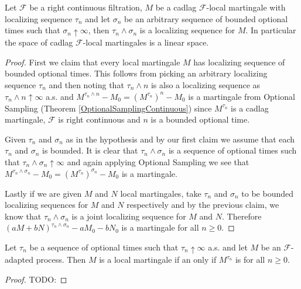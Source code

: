 \begin{lem}Let $\mathcal{F}$ be a right continuous filtration, $M$ be a cadlag $\mathcal{F}$-local martingale with localizing sequence $\tau_n$ and let $\sigma_n$ be an arbitrary sequence of bounded optional times such that $\sigma_n \uparrow \infty$, then $\tau_n \wedge \sigma_n$ is a localizing sequence for $M$.  In particular the space of cadlag $\mathcal{F}$-local martingales is a linear space.
\end{lem}
\begin{proof}
First we claim that every local martingale $M$ has localizing sequence of bounded optional times.  This follows from picking an arbitrary localizing sequence $\tau_n$ and then noting that $\tau_n \wedge n$ is also a localizing sequence as $\tau_n \wedge n \uparrow \infty$ a.s. and $M^{\tau_n \wedge n} -M_0 = (M^{\tau_n})^n - M_0$ is a martingale from Optional Sampling (Theorem \ref{OptionalSamplingContinuous}) since $M^{\tau_n}$ is a cadlag martingale, $\mathcal{F}$ is right continuous and $n$ is a bounded optional time.

Given $\tau_n$ and $\sigma_n$ as in the hypothesis and by our first claim we assume that each $\tau_n$ and $\sigma_n$ is bounded.  It is clear that $\tau_n \wedge \sigma_n$ is a sequence of optional times such that $\tau_n \wedge \sigma_n \uparrow \infty$ and again applying Optional Sampling we see that $M^{\tau_n \wedge \sigma_n} -M_0 = (M^{\tau_n})^{\sigma_n} - M_0$ is a martingale.  

Lastly if we are given $M$ and $N$ local martingales, take $\tau_n$ and $\sigma_n$ to be bounded localizing sequences for $M$ and $N$ respectively and by the previous claim, we know that $\tau_n \wedge \sigma_n$ is a joint localizing sequence for $M$ and $N$.   Therefore $(aM + bN)^{\tau_n \wedge \sigma_n} - a M_0 - b N_0$ is a martingale for all $n \geq 0$.
\end{proof}

\begin{lem}\label{LocalMartingaleLocalProperty}Let $\tau_n$ be a sequence of optional times such that $\tau_n \uparrow \infty$ a.s.  and let $M$ be an $\mathcal{F}$-adapted process.  Then $M$ is a local martingale if an only if $M^{\tau_n}$ is for all $n\geq 0$.
\end{lem}
\begin{proof}
TODO:
\end{proof}

